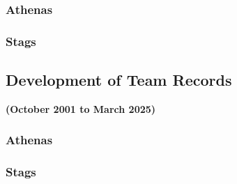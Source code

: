 \subsubsection{Athenas}
\subsubsection{Stags}

\subsection{Development of Team Records}
\textbf{(October 2001 to March 2025)}
\subsubsection{Athenas}
\subsubsection{Stags}

